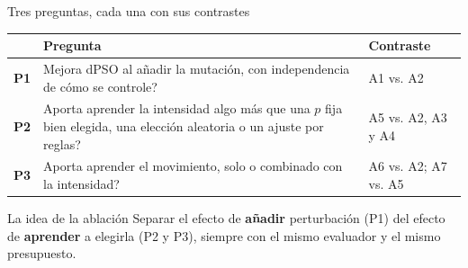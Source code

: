 \documentclass[aspectratio=169,11pt]{beamer}
\newcommand{\destacado}[1]{\textcolor{primary}{\textbf{#1}}}
\begin{document}
\begin{frame}{Tres preguntas, cada una con sus contrastes}
  \small
  \setlength{\tabcolsep}{8pt}
  \renewcommand{\arraystretch}{1.9}
  \begin{tabular}{@{}c p{} l@{}}
    \toprule
    & \textbf{\color{primary}Pregunta} & \textbf{\color{primary}Contraste} \\
    \midrule
    \destacado{P1} & \textquestiondown{}Mejora dPSO al añadir la mutación, con independencia de cómo se controle? & A1 vs. A2 \\
    \destacado{P2} & \textquestiondown{}Aporta aprender la intensidad algo más que una $p$ fija bien elegida, una elección aleatoria o un ajuste por reglas? & A5 vs. A2, A3 y A4 \\
    \destacado{P3} & \textquestiondown{}Aporta aprender el movimiento, solo o combinado con la intensidad? & A6 vs. A2;\; A7 vs. A5 \\
    \bottomrule
  \end{tabular}

  \vspace{0.35cm}
  \begin{exampleblock}{La idea de la ablación}
    \small
    Separar el efecto de \textbf{añadir} perturbación (P1) del efecto de \textbf{aprender} a elegirla (P2 y P3), siempre con el mismo evaluador y el mismo presupuesto.
  \end{exampleblock}
\end{frame}
\end{document}
